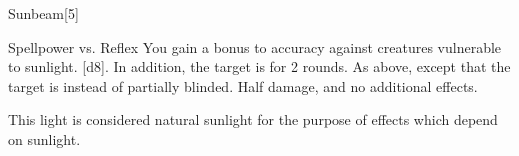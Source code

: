 \begin{spellsection}{Sunbeam}[5]
    \begin{spellheader}
    \end{spellheader}
    \begin{spellcontent}
        \begin{spelltargetinginfo}
        \end{spelltargetinginfo}
        \begin{spelleffects}
            \begin{spellattack}{Spellpower vs. Reflex}
                \spellspecial You gain a  bonus to accuracy against creatures vulnerable to sunlight.
                \spellsuccess {}[d8]. In addition, the target is \partiallyblinded for 2 rounds.
                \spellcritical As above, except that the target is \blinded instead of partially blinded.
                \spellfailure Half damage, and no additional effects.
            \end{spellattack}
        \end{spelleffects}
    \end{spellcontent}
    \begin{spellfooter}
        \spellnotes This light is considered natural sunlight for the purpose of effects which depend on sunlight.
        \miscastexplode
    \end{spellfooter}
\end{spellsection}

